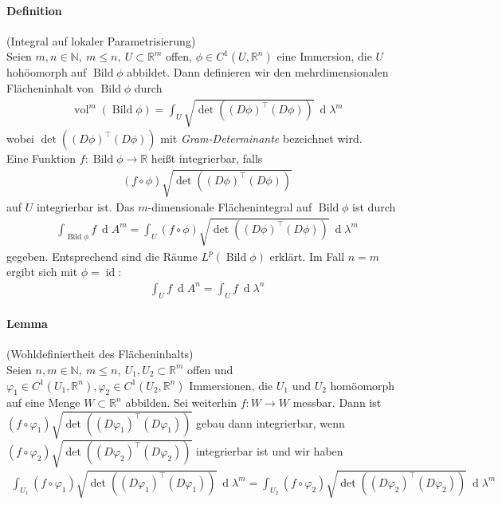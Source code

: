 \documentclass[12pt,a4paper,fleqn]{article}
\def\R{{\mathbb{R}}}
\def\d{{\operatorname{d}}}
\begin{document}
\paragraph{Definition} (Integral auf lokaler Parametrisierung)\\
Seien $m, n \in \mathbb{N},\ m \leq n,\ U \subset \R^m$ offen, $\phi \in C^1(U, \R^n)$ eine Immersion, die $U$ hohöomorph auf $\operatorname{Bild} \phi$ abbildet. Dann definieren wir den mehrdimensionalen Flächeninhalt von $\operatorname{Bild} \phi$ durch
\begin{align*}
\operatorname{vol}^m(\operatorname{Bild} \phi) = \int_U \sqrt{\det((D\phi)^\top(D\phi))}\ \d\lambda^m
\end{align*}
wobei $\det ((D\phi)^\top(D\phi))$ mit \textit{Gram-Determinante} bezeichnet wird.\\
 Eine Funktion $f\colon \operatorname{Bild} \phi \rightarrow \R$ heißt integrierbar, falls
 \begin{align*}
 (f \circ \phi)\sqrt{\det((D\phi)^\top(D\phi))}
 \end{align*}
 auf $U$ integrierbar ist. Das $m$-dimensionale Flächenintegral auf $\operatorname{Bild}\phi$ ist durch 
 \begin{align*}
 \int_{\operatorname{Bild} \phi} f\ \d A^m = \int_U (f \circ \phi)\sqrt{\det((D\phi)^\top(D\phi))}\ \d\lambda^m
 \end{align*}
 gegeben. Entsprechend sind die Räume $L^p(\operatorname{Bild}\phi)$ erklärt.
 Im Fall $n = m$ ergibt sich mit $\phi = \operatorname{id}$:
 \begin{align*}
 \int_U f\ \d A^n = \int_U f\ \d\lambda^n
 \end{align*}
 
 \paragraph{Lemma} (Wohldefiniertheit des Flächeninhalts)\\
 Seien $n, m \in \mathbb{N},\ m \leq n,\ U_1, U_2 \subset \R^m$ offen und $\varphi_1 \in C^1(U_1, \R^n), \varphi_2 \in C^1(U_2, \R^n)$ Immersionen, die $U_1$ und $U_2$ homöomorph auf eine Menge $W\subset \R^n$ abbilden. Sei weiterhin $f\colon W \rightarrow W$ messbar. Dann ist $(f \circ \varphi_1)\sqrt{\det((D\varphi_1)^\top(D\varphi_1))}$ gebau dann integrierbar, wenn $(f \circ \varphi_2)\sqrt{\det((D\varphi_2)^\top(D\varphi_2))}$ integrierbar ist und wir haben
 \begin{align*}
 \int_{U_1} (f \circ \varphi_1)\sqrt{\det((D\varphi_1)^\top(D\varphi_1))}\ \d\lambda^m = \int_{U_2} (f \circ \varphi_2)\sqrt{\det((D\varphi_2)^\top(D\varphi_2))}\ \d\lambda^m
 \end{align*}
 
\end{document}
